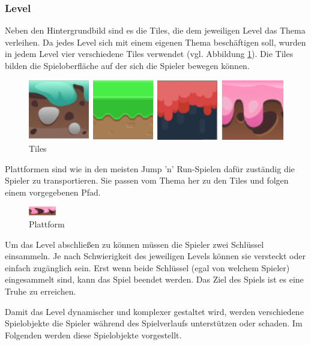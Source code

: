 \subsubsection{Level}
\label{subsubsec:implementierung:umsetzung:realisierung:level}
Neben den Hintergrundbild sind es die Tiles, die dem jeweiligen Level das Thema verleihen. Da jedes Level sich mit einem eigenen Thema beschäftigen soll, wurden in jedem Level vier verschiedene Tiles verwendet (vgl. Abbildung \ref{fig:realisierung:realisierung:level:tiles}). Die Tiles bilden die Spieloberfläche auf der sich die Spieler bewegen können. 

\begin{figure}[H]
    \begin{center}
      \includegraphics[width=.5\linewidth]{img/realisierung/assets/tiles_2}
      \caption{Tiles}
      \label{fig:realisierung:realisierung:level:tiles}
    \end{center}
\end{figure}

Plattformen sind wie in den meisten Jump 'n' Run-Spielen dafür zuständig die Spieler zu transportieren. Sie passen vom Thema her zu den Tiles und folgen einem vorgegebenen Pfad. 

\begin{figure}[H]
    \begin{center}
      \includegraphics[width=.1\linewidth]{img/realisierung/assets/plattform}
      \caption{Plattform}
      \label{fig:realisierung:realisierung:level:plattform}
    \end{center}
\end{figure}

Um das Level abschließen zu können müssen die Spieler zwei Schlüssel einsammeln. Je nach Schwierigkeit des jeweiligen Levels können sie versteckt oder einfach zugänglich sein. Erst wenn beide Schlüssel (egal von welchem Spieler) eingesammelt sind, kann das Spiel beendet werden. Das Ziel des Spiels ist es eine Truhe zu erreichen. 

Damit das Level dynamischer und komplexer gestaltet wird, werden verschiedene Spielobjekte die Spieler während des Spielverlaufs unterstützen oder schaden. Im Folgenden werden diese Spielobjekte vorgestellt.

